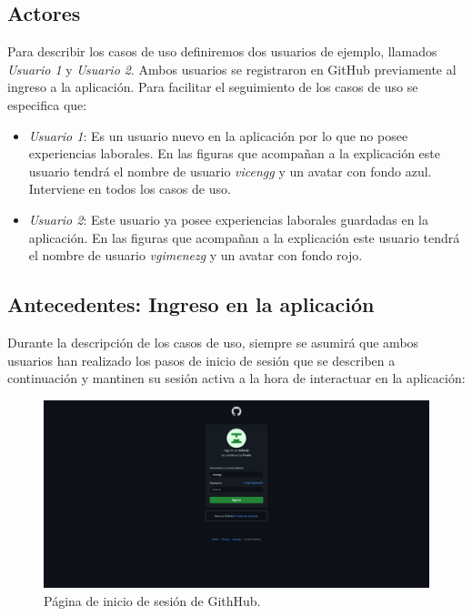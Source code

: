 \documentclass[a4paper, 12pt]{book}
\begin{document}
    \subsection{Actores}
    \label{subsec:actors}
    Para describir los casos de uso definiremos dos usuarios de ejemplo, llamados \emph{Usuario 1} y \emph{Usuario 2}.
    Ambos usuarios se registraron en GitHub previamente al ingreso a la aplicación. Para facilitar el seguimiento de los casos
    de uso se especifica que:
    \begin{itemize}
        \item \emph{Usuario 1}: Es un usuario nuevo en la aplicación por lo que no posee experiencias laborales.
        En las figuras que acompañan a la explicación este usuario tendrá el nombre de usuario \emph{vicengg} y un avatar con fondo azul.
        Interviene en todos los casos de uso.
        \item \emph{Usuario 2}: Este usuario ya posee experiencias laborales guardadas en la aplicación.
        En las figuras que acompañan a la explicación este usuario tendrá el nombre de usuario \emph{vgimenezg} y un avatar con fondo rojo.
    \end{itemize}

    \subsection{Antecedentes: Ingreso en la aplicación}
    \label{subsec:background}
    Durante la descripción de los casos de uso, siempre se asumirá que ambos usuarios han realizado los pasos de inicio de sesión
    que se describen a continuación y mantinen su sesión activa a la hora de interactuar en la aplicación:

    \begin{figure}
        \centering
        \includegraphics[width=15cm, keepaspectratio]{img/0.1.png}
        \caption{Página de inicio de sesión de GithHub.}\label{fig:use_cases_0_1}
    \end{figure}
\end{document}
